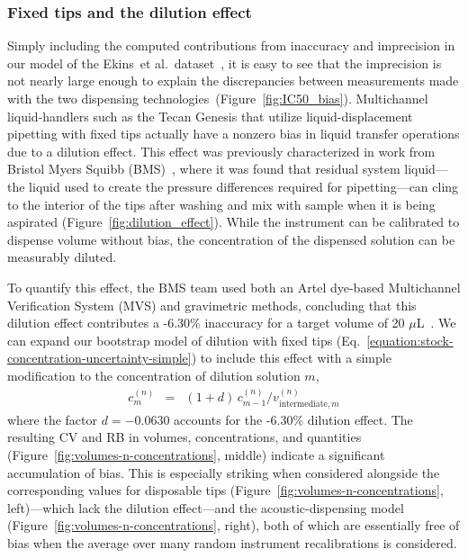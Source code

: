 \documentclass[aps,pre,twocolumn,nofootinbib,superscriptaddress,linenumbers]{revtex4-1}
\begin{document}
\subsubsection*{Fixed tips and the dilution effect}

Simply including the computed contributions from inaccuracy and imprecision in our model of the  Ekins~et al.~dataset~\cite{ekins_dispensing_2013}, it is easy to see that the imprecision is not nearly large enough to explain the discrepancies between measurements made with the two dispensing technologies~(Figure~\ref{fig:IC50_bias}).
Multichannel liquid-handlers such as the Tecan Genesis that utilize liquid-displacement pipetting with fixed tips actually have a nonzero bias in liquid transfer operations due to a dilution effect. 
This effect was previously characterized in work from Bristol Myers Squibb (BMS)~\cite{dong_use_2006,gu_dilution_2007}, where it was found that residual system liquid---the liquid used to create the pressure differences required for pipetting---can cling to the interior of the tips after washing and mix with sample when it is being aspirated (Figure~\ref{fig:dilution_effect}). 
While the instrument can be calibrated to dispense volume without bias, the concentration of the dispensed solution can be measurably diluted.

To quantify this effect, the BMS team used both an Artel dye-based Multichannel Verification System (MVS) and gravimetric methods, concluding that this dilution effect contributes a -6.30\% inaccuracy for a target volume of 20 $\mu$L~\cite{dong_use_2006}.
We can expand our bootstrap model of dilution with fixed tips (Eq.~\ref{equation:stock-concentration-uncertainty-simple}) to include this effect with a simple modification to the concentration of dilution solution $m$,
\begin{eqnarray}
c_m^{(n)} &=& (1 + d) \, c_{m-1}^{(n)} / v_{\mathrm{intermediate},m}^{(n)}
\end{eqnarray}
where the factor $d = -0.0630$ accounts for the -6.30\% dilution effect.
The resulting CV and RB in volumes, concentrations, and quantities (Figure~\ref{fig:volumes-n-concentrations}, middle) indicate a significant accumulation of bias.
This is especially striking when considered alongside the corresponding values for disposable tips (Figure~\ref{fig:volumes-n-concentrations}, left)---which lack the dilution effect---and the acoustic-dispensing model (Figure~\ref{fig:volumes-n-concentrations}, right), both of which are essentially free of bias when the average over many random instrument recalibrations is considered.
\end{document}
